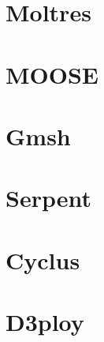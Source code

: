 \section{Moltres}

\section{MOOSE}

\section{Gmsh}

\section{Serpent}

\section{Cyclus}

\section{D3ploy}

